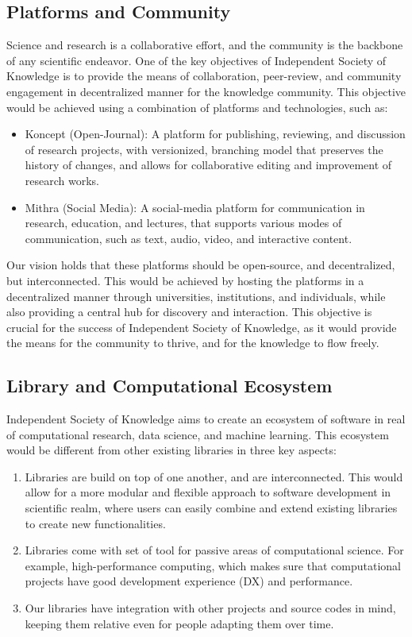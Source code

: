 \subsection{Platforms and Community}\label{subsec:platforms-and-community}
Science and research is a collaborative effort, and the community is the backbone of any scientific endeavor.
One of the key objectives of Independent Society of Knowledge is to provide the means of collaboration, peer-review, and community engagement in decentralized manner for the knowledge community.
This objective would be achieved using a combination of platforms and technologies, such as:
\begin{itemize}
    \item Koncept (Open-Journal): A platform for publishing, reviewing, and discussion of research projects, with versionized, branching model that preserves the history of changes, and allows for collaborative editing and improvement of research works.
    \item Mithra (Social Media): A social-media platform for communication in research, education, and lectures, that supports various modes of communication, such as text, audio, video, and interactive content.
\end{itemize}
Our vision holds that these platforms should be open-source, and decentralized, but interconnected.
This would be achieved by hosting the platforms in a decentralized manner through universities, institutions, and individuals, while also providing a central hub for discovery and interaction.
This objective is crucial for the success of Independent Society of Knowledge, as it would provide the means for the community to thrive, and for the knowledge to flow freely.

\subsection{Library and Computational Ecosystem}\label{subsec:library-and-computational-ecosystem}
Independent Society of Knowledge aims to create an ecosystem of software in real of computational research, data science, and machine learning.
This ecosystem would be different from other existing libraries in three key aspects:
\begin{enumerate}
    \item Libraries are build on top of one another, and are interconnected.
    This would allow for a more modular and flexible approach to software development in scientific realm, where users can easily combine and extend existing libraries to create new functionalities.
    \item Libraries come with set of tool for passive areas of computational science.
    For example, high-performance computing, which makes sure that computational projects have good development experience (DX) and performance.
    \item Our libraries have integration with other projects and source codes in mind, keeping them relative even for people adapting them over time.
\end{enumerate}

